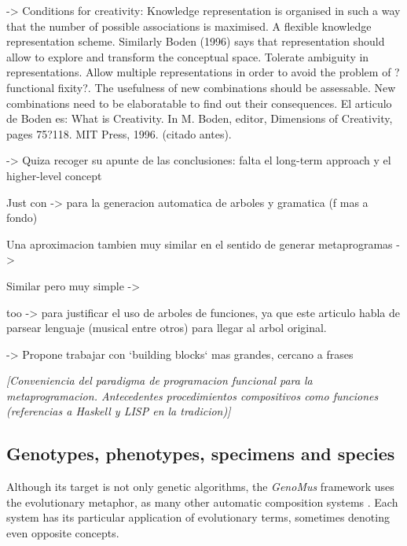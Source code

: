 \documentclass{article}
\begin{document}
{\color{red}


\cite{DBLP:journals/air/RoweP93} -> Conditions for creativity:
Knowledge representation is organised in such a
way that the number of possible associations is
maximised. A flexible knowledge representation
scheme. Similarly Boden (1996) says that representation
should allow to explore and transform the
conceptual space.
Tolerate ambiguity in representations.
Allow multiple representations in order to avoid the
problem of ?functional fixity?.
The usefulness of new combinations should be assessable.
New combinations need to be elaboratable to find
out their consequences.
El articulo de Boden es: 
What is Creativity. In M. Boden, editor, Dimensions of Creativity, pages 75?118. MIT Press, 1996. (citado antes).

\cite{Herremans:2017:FTM:3145473.3108242} -> Quiza recoger su apunte de las conclusiones: falta el long-term approach y el higher-level concept 




Just con \cite{Drewes_analgebra} -> para la generacion automatica de arboles y gramatica (f mas a fondo)

Una aproximacion tambien muy similar en el sentido de generar metaprogramas -> \cite{Spector_inductionand}

Similar pero muy simple -> \cite{Ando}

too \cite{Bod_thedata-oriented} -> para justificar el uso de arboles de funciones, ya que este articulo habla de parsear lenguaje (musical entre otros) para llegar al arbol original.

}



 
{\color{red}

\cite{DBLP:conf/icmc/Jacob95} -> Propone trabajar con `building blocks` mas grandes, cercano a frases
}


{\color{gray} \textsl{[Conveniencia del paradigma de programacion funcional para la metaprogramacion. Antecedentes procedimientos compositivos como funciones (referencias a Haskell y LISP en la tradicion)]}}





\subsection{Genotypes, phenotypes, specimens and species}

Although its target is not only genetic algorithms, the \textsl{GenoMus} framework uses the evolutionary metaphor, as many other automatic composition systems \cite{Sulyok2019, SnchezQuintana2013, add more...}. Each system has its particular application of evolutionary terms, sometimes denoting even opposite concepts. 
\end{document}
